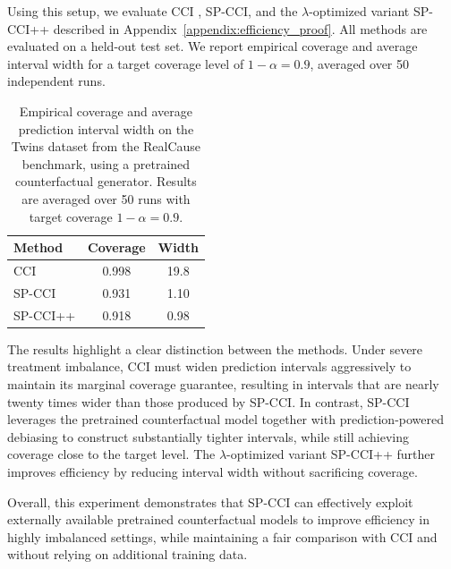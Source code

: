 \documentclass{article}
\theoremstyle{plain}
\theoremstyle{definition}
\theoremstyle{remark}
\begin{document}
Using this setup, we evaluate CCI \citep{lei2021conformal}, SP-CCI, and the $\lambda$-optimized variant SP-CCI++ described in
Appendix~\ref{appendix:efficiency_proof}. All methods are evaluated on a held-out test set. We report empirical coverage and average interval width for a target coverage level of $1-\alpha=0.9$, averaged over 50 independent runs.

\begin{table}[h!]
\centering
\begin{tabular}{lcc}
\toprule
Method & Coverage & Width \\
\midrule
CCI & 0.998 & 19.8 \\
SP-CCI & 0.931 & 1.10 \\
SP-CCI++ & 0.918 & 0.98 \\
\bottomrule
\end{tabular}
\caption{Empirical coverage and average prediction interval width on the Twins dataset
from the RealCause benchmark, using a pretrained counterfactual generator. Results are
averaged over 50 runs with target coverage $1-\alpha=0.9$.}
\label{tab:twins_results}
\end{table}

The results highlight a clear distinction between the methods. Under severe treatment imbalance, CCI must widen prediction intervals aggressively to maintain its marginal coverage guarantee, resulting in intervals that are nearly twenty times wider than those produced by SP-CCI. In contrast, SP-CCI leverages the pretrained counterfactual model together with prediction-powered debiasing to construct substantially tighter intervals, while still achieving coverage close to the target level. The $\lambda$-optimized variant SP-CCI++ further improves efficiency by reducing interval width without sacrificing coverage.

Overall, this experiment demonstrates that SP-CCI can effectively exploit externally available pretrained counterfactual models to improve efficiency in highly imbalanced settings, while maintaining a fair comparison with CCI and without relying on additional training data.




%
\end{document}
